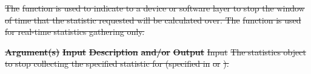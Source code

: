 \documentclass[12pt]{report} %
\providecommand{\DIFdeltex}[1]{{\protect\color{red}\sout{#1}}}                      %
\providecommand{\DIFaddend}{} %
\providecommand{\DIFdelbegin}{} %
\providecommand{\DIFdel}[1]{\texorpdfstring{\DIFdeltex{#1}}{}} %
\newcommand{\DIFscaledelfig}{0.5}
\newlength{\DIFdelgraphicswidth} %
\newlength{\DIFdelgraphicsheight} %
\newcommand{\DIFdelincludegraphics}[2][]{%
\sbox{\DIFdelgraphicsbox}{\DIFOincludegraphics[#1]{#2}}%
\settoboxwidth{\DIFdelgraphicswidth}{\DIFdelgraphicsbox} %
\settoboxtotalheight{\DIFdelgraphicsheight}{\DIFdelgraphicsbox} %
\scalebox{\DIFscaledelfig}{%
\parbox[b]{\DIFdelgraphicswidth}{\usebox{\DIFdelgraphicsbox}\\[-\baselineskip] \rule{\DIFdelgraphicswidth}{0em}}\llap{\resizebox{\DIFdelgraphicswidth}{\DIFdelgraphicsheight}{%
\setlength{\unitlength}{\DIFdelgraphicswidth}%
\begin{picture}(1,1)%
\thicklines\linethickness{2pt} %
{\color[rgb]{1,0,0}\put(0,0){\framebox(1,1){}}}%
{\color[rgb]{1,0,0}\put(0,0){\line( 1,1){1}}}%
{\color[rgb]{1,0,0}\put(0,1){\line(1,-1){1}}}%
\end{picture}%
}\hspace*{3pt}}} %
} %
\DeclareRobustCommand{\DIFaddend}{\DIFOaddend \let\includegraphics\DIFOincludegraphics} %
\DeclareRobustCommand{\DIFdelbegin}{\DIFOdelbegin \let\includegraphics\DIFdelincludegraphics} %
\begin{document}
\DIFaddend %
\DIFdelbegin %
\DIFdel{The }%
\DIFdel{function is used to indicate to a device or software layer to stop the window of time that the statistic requested will be calculated over.
The }%
\DIFdel{function is used for real-time statistics gathering only.
}%


\textbf{\DIFdel{Argument(s)}} %
\textbf{\DIFdel{Input }}  %
\textbf{\DIFdel{Description}} %
\textbf{\DIFdel{and/or}}     %
\textbf{\DIFdel{Output}} %
\DIFdel{Input  }%
\DIFdel{The statistics object to stop collecting the specified statistic for (specified in }%
\DIFdel{or }%
\DIFdel{). }%
\end{document}
